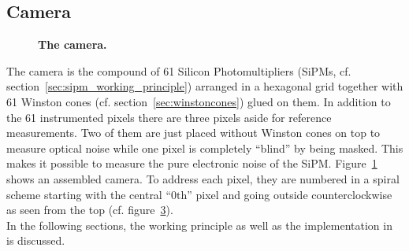 \subsection{Camera}\label{iceact:model:camera}

\begin{figure}[H]
	\centering
	\begin{subfigure}[t]{0.49\textwidth}
		\label{iceact:camera:picture}	
	\end{subfigure}
	\hfill
	\begin{subfigure}[t]{0.49\textwidth}
		\usebox{\savedimage}
		\label{iceact:camera:pixelnumbering}	
	\end{subfigure}
	\caption[The \iceact camera]{\textbf{The \iceact camera.}}	
\end{figure}

The \iceact camera is the compound of 61 Silicon Photomultipliers (SiPMs, cf. section~\ref{sec:sipm_working_principle}) arranged in a hexagonal grid together with 61 Winston cones (cf. section~\ref{sec:winstoncones}) glued on them. In addition to the 61 instrumented pixels there are three pixels aside for reference measurements. Two of them are just placed without Winston cones on top to measure optical noise while one pixel is completely \enquote{blind} by being masked. This makes it possible to measure the pure electronic noise of the SiPM. Figure~\ref{iceact:camera:picture} shows an assembled \iceact camera. To address each pixel, they are numbered in a spiral scheme starting with the central \enquote{0$\text{th}$} pixel and going outside counterclockwise as seen from the top (cf. figure~\ref{iceact:camera:pixelnumbering}).\\

In the following sections, the working principle as well as the implementation in \geant is discussed.


